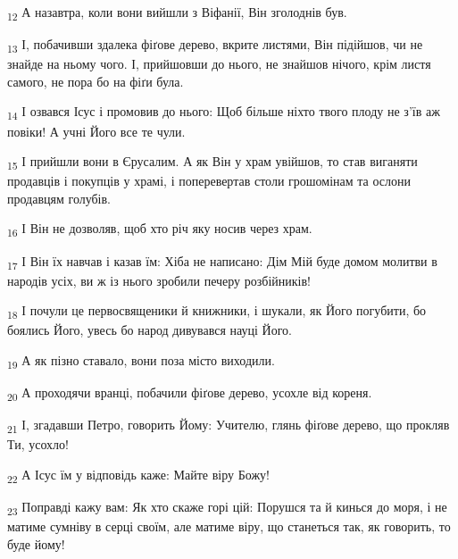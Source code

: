 \begin{tcolorbox}
\textsubscript{12} А назавтра, коли вони вийшли з Віфанії, Він зголоднів був.
\end{tcolorbox}
\begin{tcolorbox}
\textsubscript{13} І, побачивши здалека фіґове дерево, вкрите листями, Він підійшов, чи не знайде на ньому чого. І, прийшовши до нього, не знайшов нічого, крім листя самого, не пора бо на фіґи була.
\end{tcolorbox}
\begin{tcolorbox}
\textsubscript{14} І озвався Ісус і промовив до нього: Щоб більше ніхто твого плоду не з'їв аж повіки! А учні Його все те чули.
\end{tcolorbox}
\begin{tcolorbox}
\textsubscript{15} І прийшли вони в Єрусалим. А як Він у храм увійшов, то став виганяти продавців і покупців у храмі, і поперевертав столи грошомінам та ослони продавцям голубів.
\end{tcolorbox}
\begin{tcolorbox}
\textsubscript{16} І Він не дозволяв, щоб хто річ яку носив через храм.
\end{tcolorbox}
\begin{tcolorbox}
\textsubscript{17} І Він їх навчав і казав їм: Хіба не написано: Дім Мій буде домом молитви в народів усіх, ви ж із нього зробили печеру розбійників!
\end{tcolorbox}
\begin{tcolorbox}
\textsubscript{18} І почули це первосвященики й книжники, і шукали, як Його погубити, бо боялись Його, увесь бо народ дивувався науці Його.
\end{tcolorbox}
\begin{tcolorbox}
\textsubscript{19} А як пізно ставало, вони поза місто виходили.
\end{tcolorbox}
\begin{tcolorbox}
\textsubscript{20} А проходячи вранці, побачили фіґове дерево, усохле від кореня.
\end{tcolorbox}
\begin{tcolorbox}
\textsubscript{21} І, згадавши Петро, говорить Йому: Учителю, глянь фіґове дерево, що прокляв Ти, усохло!
\end{tcolorbox}
\begin{tcolorbox}
\textsubscript{22} А Ісус їм у відповідь каже: Майте віру Божу!
\end{tcolorbox}
\begin{tcolorbox}
\textsubscript{23} Поправді кажу вам: Як хто скаже горі цій: Порушся та й кинься до моря, і не матиме сумніву в серці своїм, але матиме віру, що станеться так, як говорить, то буде йому!
\end{tcolorbox}
